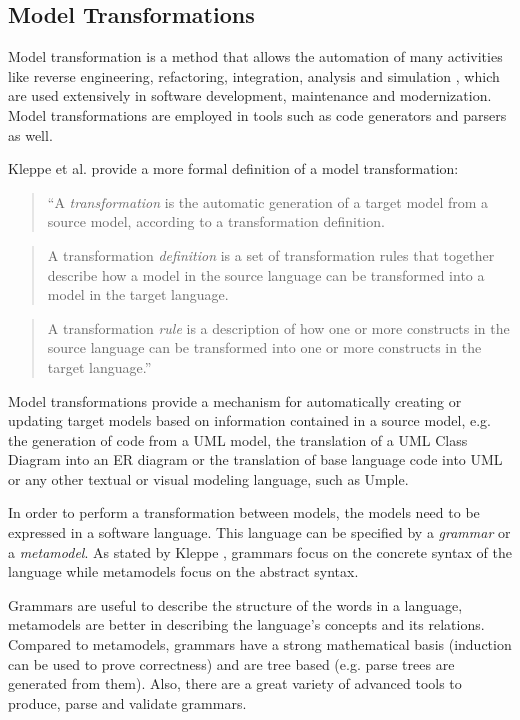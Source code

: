 \subsection{Model Transformations}

Model transformation is a method that allows the automation of many activities like reverse engineering, refactoring, integration, analysis and simulation \cite{biehl2010literature}, which are used extensively in software development, maintenance and modernization. Model transformations are employed in tools such as code generators and parsers as well.

Kleppe et al. \cite{mccKleppe} provide a more formal definition of a model transformation:


\begin{quote}
``A \textit{transformation} is the automatic generation of a target model from a source model, according to a transformation definition. 
\end{quote}
\begin{quote}
A transformation \textit{definition} is a set of transformation rules that together describe how a model in the source language can be transformed into a model in the target language.
\end{quote}
\begin{quote}
A transformation \textit{rule} is a description of how one or more constructs in the source language can be transformed into one or more constructs in the target language.''
\end{quote}

Model transformations provide a mechanism for automatically creating or updating target models based on information contained in a source model, e.g. the generation of code from a UML model, the translation of a UML Class Diagram into an ER diagram or the translation of base language code into UML or any other textual or visual modeling language, such as Umple.

In order to perform a transformation between models, the models need to be expressed in a software language. This language can be specified by a \textit{grammar} or a \textit{metamodel}. As stated by Kleppe \cite{kleppe2007language}, grammars focus on the concrete syntax of the language while metamodels focus on the abstract syntax.

Grammars are useful to describe the structure of the words in a language, metamodels are better in describing the language's concepts and its relations. Compared to metamodels, grammars have a strong mathematical basis (induction can be used to prove correctness) and are tree based (e.g. parse trees are generated from them). Also, there are a great variety of  advanced tools to produce, parse and validate grammars.

